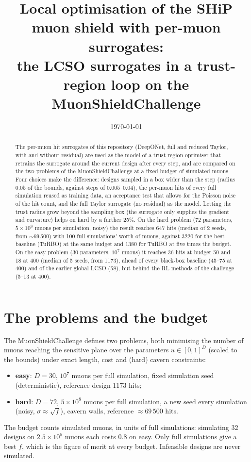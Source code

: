 \documentclass[11pt,a4paper]{article}
\title{Local optimisation of the SHiP muon shield with per-muon surrogates:\\[0.3ex]
\large the LCSO surrogates in a trust-region loop on the MuonShieldChallenge}
\author{}
\date{\today}
\begin{document}
\maketitle

\begin{abstract}
The per-muon hit surrogates of this repository (DeepONet, full and reduced Taylor, with and
without residual) are used as the model of a trust-region optimiser that retrains the surrogate
around the current design after every step, and are compared on the two problems of the
MuonShieldChallenge at a fixed budget of simulated muons. Four choices make the difference: designs
sampled in a box wider than the step (radius $0.05$ of the bounds, against steps of
$0.005$--$0.04$), the per-muon hits of every full simulation reused as training data, an acceptance
test that allows for the Poisson noise of the hit count, and the full Taylor surrogate (no
residual) as the model. Letting the trust radius grow beyond the sampling box (the surrogate only supplies
the gradient and curvature) helps on hard by a further 25\%. On the hard problem (72 parameters, $5\times10^8$ muons per simulation,
noisy) the result reaches 647 hits (median of 2 seeds, from $\sim$69\,500) with 100 full
simulations' worth of muons, against 3220 for the best baseline (TuRBO) at the same budget and
1380 for TuRBO at five times the budget. On the easy problem (30 parameters, $10^7$ muons) it
reaches 36 hits at budget 50 and 18 at 400 (median of 5 seeds, from 1173), ahead of every
black-box baseline (45--75 at 400) and of the earlier global LCSO (58), but behind the RL
methods of the challenge (5--13 at 400).
\end{abstract}

\tableofcontents

\section{The problems and the budget}

The MuonShieldChallenge defines two problems, both minimising the number of muons reaching the
sensitive plane over the parameters $u\in[0,1]^D$ (scaled to the bounds) under exact length,
cost and (hard) cavern constraints:
\begin{itemize}
  \item \textbf{easy}: $D=30$, $10^7$ muons per full simulation, fixed simulation seed
        (deterministic), reference design 1173 hits;
  \item \textbf{hard}: $D=72$, $5\times10^8$ muons per full simulation, a new seed every
        simulation (noisy, $\sigma\approx\sqrt f$), cavern walls, reference $\approx69\,500$ hits.
\end{itemize}
The budget counts simulated muons, in units of full simulations: simulating 32 designs on
$2.5\times10^5$ muons each costs $0.8$ on easy. Only full simulations give a best $f$, which is the
figure of merit at every budget. Infeasible designs are never simulated.
\end{document}
